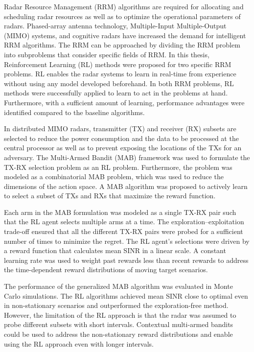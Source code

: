 \documentclass[english, 12pt, a4paper, elec, utf8, a-1b, online]{aaltothesis}
\numberwithin{equation}{section}
\begin{document}
Radar Resource Management (RRM) algorithms are required for allocating and scheduling radar resources as well as to optimize the operational parameters of radars.  
Phased-array antenna technology, Multiple-Input Multiple-Output (MIMO) systems, and cognitive radars have increased the demand for intelligent RRM algorithms.
The RRM can be approached by dividing the RRM problem into subproblems that consider specific fields of RRM.
In this thesis, Reinforcement Learning (RL) methods were proposed for two specific RRM problems.
RL enables the radar systems to learn in real-time from experience without using any model developed beforehand.
In both RRM problems, RL methods were successfully applied to learn to act in the problems at hand. 
Furthermore, with a sufficient amount of learning, performance advantages were identified compared to the baseline algorithms.

In distributed MIMO radars, transmitter (TX) and receiver (RX) subsets are selected to reduce the power consumption and the data to be processed at the central processor as well as to prevent exposing the locations of the TXs for an adversary.
The Multi-Armed Bandit (MAB) framework was used to formulate the TX-RX selection problem as an RL problem.
Furthermore, the problem was modeled as a combinatorial MAB problem, which was used to reduce the dimensions of the action space.
A MAB algorithm was proposed to actively learn to select a subset of TXs and RXs that maximize the reward function.

Each arm in the MAB formulation was modeled as a single TX-RX pair such that the RL agent selects multiple arms at a time. 
The exploration--exploitation trade-off ensured that all the different TX-RX pairs were probed for a sufficient number of times to minimize the regret. 
The RL agent's selections were driven by a reward function that calculates mean SINR in a linear scale.
A constant learning rate was used to weight past rewards less than recent rewards to address the time-dependent reward distributions of moving target scenarios.

The performance of the generalized MAB algorithm was evaluated in Monte Carlo simulations.
The RL algorithms achieved mean SINR close to optimal even in non-stationary scenarios and outperformed the exploration-free method.
However, the limitation of the RL approach is that the radar was assumed to probe different subsets with short intervals.
Contextual multi-armed bandits \cite{Lu2010} could be used to address the non-stationary reward distributions and enable using the RL approach even with longer intervals. 
\end{document}
